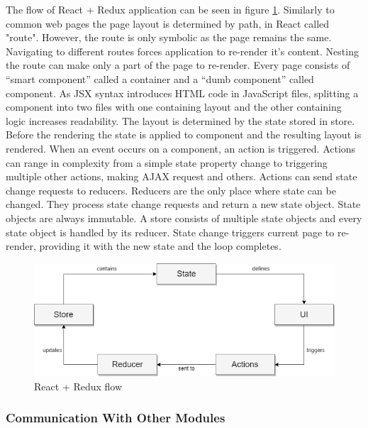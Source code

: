 The flow of React + Redux application can be seen in figure \ref{fig04:reduxFlow}. Similarly to common web pages the page layout is determined by path, in React called "route". However, the route is only symbolic as the page remains the same. Navigating to different routes forces application to re-render it's content. Nesting the route can make only a part of the page to re-render. Every page consists of “smart component” called a container and a “dumb component” called component. As JSX syntax introduces HTML code in JavaScript files, splitting a component into two files with one containing layout and the other containing logic increases readability. The layout is determined by the state stored in store. Before the rendering the state is applied to component and the resulting layout is rendered. When an event occurs on a component, an action is triggered. Actions can range in complexity from a simple state property change to triggering multiple other actions, making AJAX request and others. Actions can send state change requests to reducers. Reducers are the only place where state can be changed. They process state change requests and return a new state object. State objects are always immutable. A store consists of multiple state objects and every state object is handled by its reducer. State change triggers current page to re-render, providing it with the new state and the loop completes.

\begin{figure}[ht]\centering
\includegraphics[width=1.0\textwidth]{img/reactReduxFlow.png}
\caption{React + Redux flow}
\label{fig04:reduxFlow}
\end{figure}

\subsubsection{Communication With Other Modules}

